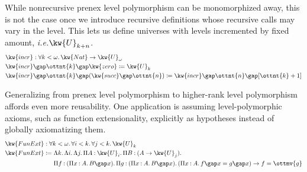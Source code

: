 \documentclass[a4paper,UKenglish,cleveref,autoref,thm-restate]{lipics-v2021}
\makeatletter
\newcommand{\ie}{\textit{i.e.}\@\xspace}
\makeatother
\begin{document}
While nonrecursive prenex level polymorphism can be monomorphized away,
this is not the case once we introduce recursive definitions
whose recursive calls may vary in the level.
This lets us define universes with levels incremented by fixed amount,
\ie $ \kw{U}_{   k  +  n   } $.
%
\begin{align*}
  & \kw{ incr }  :   \forall  k  <   \omega   \mathpunct{.}   \kw{ Nat }    \to   \kw{U}_{  \omega  }   \\
  &   \kw{ incr }   \gap  \ottnt{k}   \gap   \kw{ zero }   \coloneqq  \kw{U}_{ k }  \\
  &   \kw{ incr }   \gap  \ottnt{k}   \gap   (   \kw{ succ }   \gap  \ottnt{n}  )   \coloneqq    \kw{ incr }   \gap  \ottnt{n}   \gap [   \ottnt{k}  + 1   ] 
\end{align*}

Generalizing from prenex level polymorphism to higher-rank level polymorphism affords even more reusability.
One application is assuming level-polymorphic axioms,
such as function extensionality,
explicitly as hypotheses instead of globally axiomatizing them.
%
\begin{align*}
   \kw{ FunExt }  &:  \forall  k  <   \omega   \mathpunct{.}   \forall  i  <  k  \mathpunct{.}   \forall  j  <  k  \mathpunct{.}   \kw{U}_{ k }     \\
   \kw{ FunExt }  &\coloneqq  \Lambda  k  \mathpunct{.}   \Lambda  i  \mathpunct{.}   \Lambda  j  \mathpunct{.}   \Pi  A  \mathbin{:}   \kw{U}_{ i }   \mathpunct{.}   \Pi  B  \mathbin{:}   (  A  \to   \kw{U}_{ j }   )   \mathpunct{.}   \relax       \\
  &\phantom{{} \coloneqq {}}   \Pi  f  \mathbin{:}   (   \Pi  x  \mathbin{:}  A  \mathpunct{.}  B   \gap  x  )   \mathpunct{.}   \Pi  g  \mathbin{:}   (   \Pi  x  \mathbin{:}  A  \mathpunct{.}  B   \gap  x  )   \mathpunct{.}   (     \Pi  x  \mathbin{:}  A  \mathpunct{.}  f   \gap  x   =  g   \gap  x  )     \to    f  =  \ottmv{g}   
\end{align*}
\end{document}
